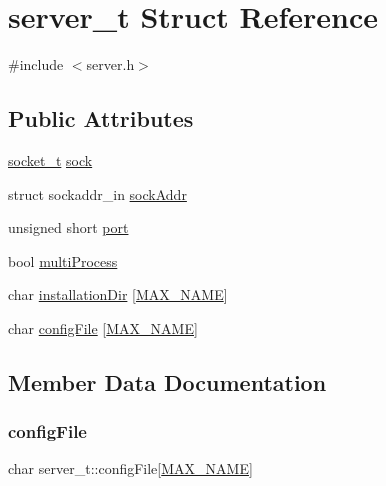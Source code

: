 \hypertarget{structserver__t}{}\section{server\+\_\+t Struct Reference}
\label{structserver__t}


{\ttfamily \#include $<$server.\+h$>$}

\subsection*{Public Attributes}
\begin{DoxyCompactItemize}
\item 
\hyperlink{datatypes_8h_a30353f381f5fccbb956eea1f3a110b6c}{socket\+\_\+t} \hyperlink{structserver__t_a51c1726304d4644523c35656c5f9b20b}{sock}
\item 
struct sockaddr\+\_\+in \hyperlink{structserver__t_a515d831aa349c908c0a2c0e86b5e1c43}{sock\+Addr}
\item 
unsigned short \hyperlink{structserver__t_ac60a631d2267e34f3b5dd3555ae3ab43}{port}
\item 
bool \hyperlink{structserver__t_a04e5158f927016ae6577600862d8750d}{multi\+Process}
\item 
char \hyperlink{structserver__t_ae5ccab8bd0fb6744f89ae6a7e13d8553}{installation\+Dir} \mbox{[}\hyperlink{datatypes_8h_ac7c0207aa5a0e10d378be03b68041350}{M\+A\+X\+\_\+\+N\+A\+ME}\mbox{]}
\item 
char \hyperlink{structserver__t_a060691589f33626b030916c155d560f1}{config\+File} \mbox{[}\hyperlink{datatypes_8h_ac7c0207aa5a0e10d378be03b68041350}{M\+A\+X\+\_\+\+N\+A\+ME}\mbox{]}
\end{DoxyCompactItemize}


\subsection{Member Data Documentation}
\mbox{\label{structserver__t_a060691589f33626b030916c155d560f1}} 
\subsubsection{\texorpdfstring{config\+File}{configFile}}
{\footnotesize\ttfamily char server\+\_\+t\+::config\+File\mbox{[}\hyperlink{datatypes_8h_ac7c0207aa5a0e10d378be03b68041350}{M\+A\+X\+\_\+\+N\+A\+ME}\mbox{]}}

